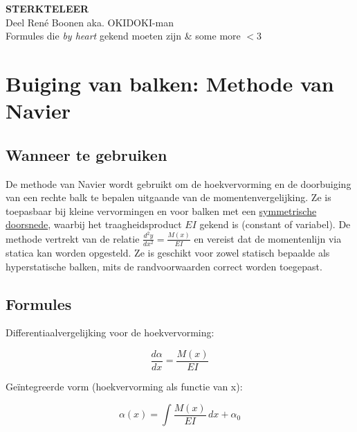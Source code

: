 \documentclass[a4paper,11pt]{article}
\begin{document}
\begin{center}
    {\LARGE \textbf{STERKTELEER}}\\[0.3cm]
    {\large Deel René Boonen aka. OKIDOKI-man}\\[0.5cm]
    Formules die \textit{by heart} gekend moeten zijn \& some more $<$3
\end{center}

\vspace{.6cm}

\section{Buiging van balken: Methode van Navier}

\subsection*{Wanneer te gebruiken}

De methode van Navier wordt gebruikt om de hoekvervorming en de doorbuiging van een rechte balk te bepalen uitgaande van de momentenvergelijking. Ze is toepasbaar bij kleine vervormingen en voor balken met een \underline{symmetrische doorsnede}, waarbij het traagheidsproduct $EI$ gekend is (constant of variabel). De methode vertrekt van de relatie $\frac{d^2 y}{dx^2} = \frac{M(x)}{EI}$ en vereist dat de momentenlijn via statica kan worden opgesteld. Ze is geschikt voor zowel statisch bepaalde als hyperstatische balken, mits de randvoorwaarden correct worden toegepast.



\subsection*{Formules}
\vspace{.2cm}

\noindent
\begin{minipage}[t]{0.48\textwidth}
\noindent Differentiaalvergelijking voor de hoekvervorming:

\vspace{0.8em}

\begin{equation}
\frac{d\alpha}{dx} = \frac{M(x)}{EI}
\end{equation}
\end{minipage}
\hfill
\begin{minipage}[t]{0.48\textwidth}
\noindent Geïntegreerde vorm (hoekvervorming als functie van x):

\vspace{0.8em}

\begin{equation}
\alpha(x) = \int \frac{M(x)}{EI} \, dx + \alpha_0
\end{equation}
\end{minipage}
\end{document}
